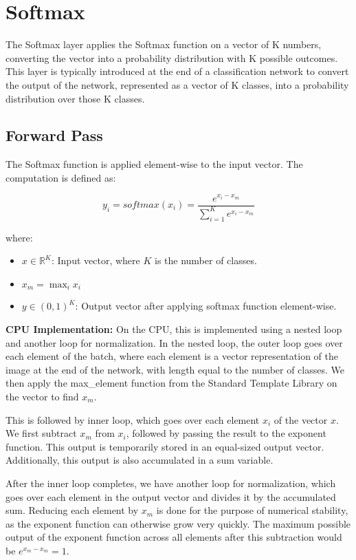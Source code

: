 \section{Softmax}

The Softmax layer applies the Softmax function on a vector of K numbers, converting the vector into a probability distribution with K possible outcomes. This layer is typically introduced at the end of a classification network to convert the output of the network, represented as a vector of K classes, into a probability distribution over those K classes.

\subsection{Forward Pass}

The Softmax function is applied element-wise to the input vector. The computation is defined as:

\[
    y_i = softmax(x_{i}) = \frac{e^{x_{i} - x_{m}}}{\sum_{i=1}^K e^{x_{i} - x_{m}}}
\]

where:
\begin{itemize}
    \item \( x \in \mathbb{R}^{K} \): Input vector, where \( K \) is the number of classes.
    \item \( x_{m} = \max_{i} x_{i} \)
    \item \( y \in (0, 1)^K \): Output vector after applying softmax function element-wise.
\end{itemize}

\textbf{CPU Implementation:}
On the CPU, this is implemented using a nested loop and another loop for normalization. In the nested loop, the outer loop goes over each element of the batch, where each element is a vector representation of the image at the end of the network, with length equal to the number of classes. We then apply the max\_element function from the Standard Template Library on the vector to find $x_m$.

This is followed by inner loop, which goes over each element $x_i$ of the vector $x$. We first subtract $x_m$ from $x_i$, followed by passing the result to the exponent function. This output is temporarily stored in an equal-sized output vector. Additionally, this output is also accumulated in a sum variable.

After the inner loop completes, we have another loop for normalization, which goes over each element in the output vector and divides it by the accumulated sum. Reducing each element by $x_m$ is done for the purpose of numerical stability, as the exponent function can otherwise grow very quickly. The maximum possible output of the exponent function across all elements after this subtraction would be $e^{x_m - x_m} = 1$.


